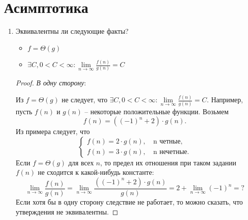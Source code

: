 \section{Асимптотика}
\begin{enumerate}
  \item	
	Эквивалентны ли следующие факты?
	\begin{itemize}
		\item $f = \Theta(g)$
		\item $\exists C,  0 < C < \infty : \lim\limits_{n \to \infty} \frac{f(n)}{g(n)} = C$
	\end{itemize}

  \begin{proof}
    \textit{В одну сторону}:

    Из $f = \Theta(g)$ не следует, что $\exists C,  0 < C < \infty : \lim\limits_{n \to \infty} \frac{f(n)}{g(n)} = C$.
    Например, пусть $f(n)$ и $g(n)$ -- некоторые положительные функции. Возьмем
    \begin{equation}
      f(n) = ((-1)^n + 2)\cdot g(n).
    \end{equation}
    Из примера следует, что
    \begin{equation}
      \begin{cases}
        f(n) = 2\cdot g(n),\quad \text{n четные}, \\        
        f(n) = 3\cdot g(n),\quad \text{n нечетные}.
      \end{cases}
    \end{equation}
    Если $f = \Theta(g)$ для всех $n$, то предел их отношения при таком задании $f(n)$ не сходится к какой-нибудь константе:
    \begin{equation}
      \lim\limits_{n \to \infty} \frac{f(n)}{g(n)} = \lim\limits_{n \to \infty} \frac{((-1)^n + 2)\cdot g(n)}{g(n)} = 2 + \lim\limits_{n \to \infty} (-1)^n = ?
    \end{equation}
    Если хотя бы в одну сторону следствие не работает, то можно сказать, что утверждения не эквивалентны.


\end{proof}
\end{enumerate}
